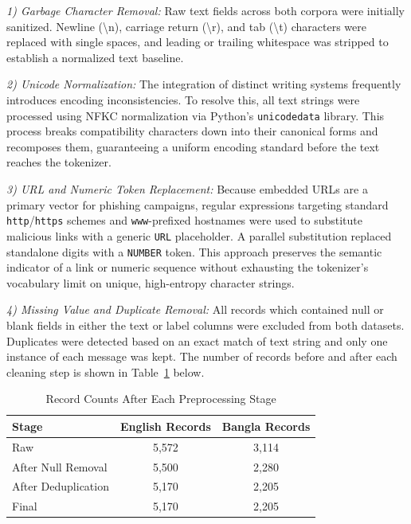 \documentclass[journal]{IEEEtran}
\begin{document}
\textit{1) Garbage Character Removal:} Raw text fields across both corpora were initially sanitized. Newline (\textbackslash n), carriage return (\textbackslash r), and tab (\textbackslash t) characters were replaced with single spaces, and leading or trailing whitespace was stripped to establish a normalized text baseline.

\textit{2) Unicode Normalization:} The integration of distinct writing systems frequently introduces encoding inconsistencies. To resolve this, all text strings were processed using NFKC normalization via Python's \texttt{unicodedata} library. This process breaks compatibility characters down into their canonical forms and recomposes them, guaranteeing a uniform encoding standard before the text reaches the tokenizer.

\textit{3) URL and Numeric Token Replacement:} Because embedded URLs are a primary vector for phishing campaigns, regular expressions targeting standard \texttt{http}/\texttt{https} schemes and \texttt{www}-prefixed hostnames were used to substitute malicious links with a generic \texttt{URL} placeholder. A parallel substitution replaced standalone digits with a \texttt{NUMBER} token. This approach preserves the semantic indicator of a link or numeric sequence without exhausting the tokenizer's vocabulary limit on unique, high-entropy character strings.

\textit{4) Missing Value and Duplicate Removal:} All records which contained
null or blank fields in either the text or label columns were excluded
from both datasets. Duplicates were detected based on an exact match of
text string and only one instance of each message was kept. The number
of records before and after each cleaning step is shown in Table~\ref{tab:dataset_prep}
below.

\begin{table}[htbp]
\caption{Record Counts After Each Preprocessing Stage}
\label{tab:dataset_prep}
\centering
\begin{tabular}{lcc}
\toprule
\textbf{Stage} & \textbf{English Records} & \textbf{Bangla Records} \\
\midrule
Raw & 5,572 & 3,114 \\
After Null Removal & 5,500 & 2,280 \\
After Deduplication & 5,170 & 2,205 \\
Final & 5,170 & 2,205 \\
\bottomrule
\end{tabular}
\end{table}
\end{document}
